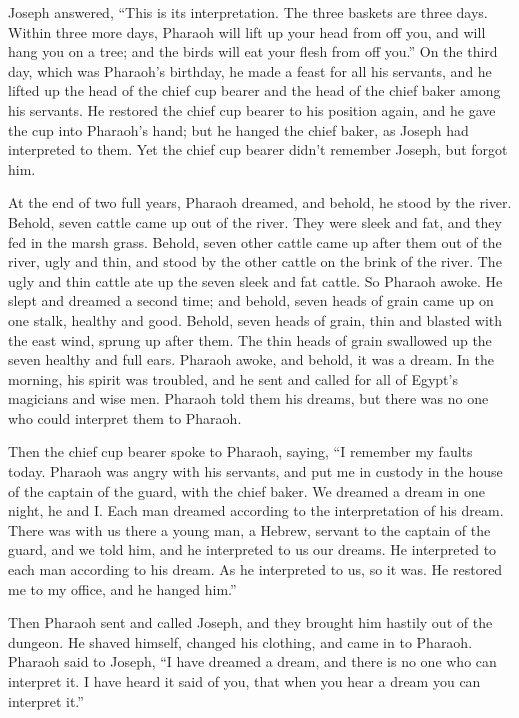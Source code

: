 \myverse{}Joseph answered, “This is its interpretation. The three baskets are three days.   \myverse{}Within three more days, Pharaoh will lift up your head from off you, and will hang you on a tree; and the birds will eat your flesh from off you.”   \myverse{}On the third day, which was Pharaoh’s birthday, he made a feast for all his servants, and he lifted up the head of the chief cup bearer and the head of the chief baker among his servants.   \myverse{}He restored the chief cup bearer to his position again, and he gave the cup into Pharaoh’s hand;   \myverse{}but he hanged the chief baker, as Joseph had interpreted to them.   \myverse{}Yet the chief cup bearer didn’t remember Joseph, but forgot him.

\mychapter{}
\myverse*{}At the end of two full years, Pharaoh dreamed, and behold, he stood by the river.   \myverse{}Behold, seven cattle came up out of the river. They were sleek and fat, and they fed in the marsh grass.   \myverse{}Behold, seven other cattle came up after them out of the river, ugly and thin, and stood by the other cattle on the brink of the river.   \myverse{}The ugly and thin cattle ate up the seven sleek and fat cattle. So Pharaoh awoke.   \myverse{}He slept and dreamed a second time; and behold, seven heads of grain came up on one stalk, healthy and good.   \myverse{}Behold, seven heads of grain, thin and blasted with the east wind, sprung up after them.   \myverse{}The thin heads of grain swallowed up the seven healthy and full ears. Pharaoh awoke, and behold, it was a dream.   \myverse{}In the morning, his spirit was troubled, and he sent and called for all of Egypt’s magicians and wise men. Pharaoh told them his dreams, but there was no one who could interpret them to Pharaoh.

\myverse{}Then the chief cup bearer spoke to Pharaoh, saying, “I remember my faults today.   \myverse{} Pharaoh was angry with his servants, and put me in custody in the house of the captain of the guard, with the chief baker.   \myverse{}We dreamed a dream in one night, he and I. Each man dreamed according to the interpretation of his dream.   \myverse{}There was with us there a young man, a Hebrew, servant to the captain of the guard, and we told him, and he interpreted to us our dreams. He interpreted to each man according to his dream.   \myverse{}As he interpreted to us, so it was. He restored me to my office, and he hanged him.”

\myverse{}Then Pharaoh sent and called Joseph, and they brought him hastily out of the dungeon. He shaved himself, changed his clothing, and came in to Pharaoh.   \myverse{}Pharaoh said to Joseph, “I have dreamed a dream, and there is no one who can interpret it. I have heard it said of you, that when you hear a dream you can interpret it.”

